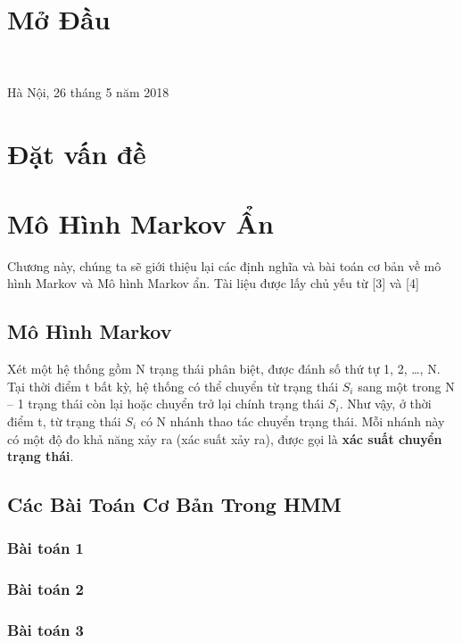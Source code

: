 \documentclass[13pt]{extreport}
\begin{document}
\tableofcontents
\newpage


\newpage
{}
\chapter*{Mở Đầu}\

\begin{flushright}
Hà Nội, 26 tháng 5 năm 2018\\
\end{flushright}

\chapter{Đặt vấn đề}


\newpage
\chapter{Mô Hình Markov Ẩn}
Chương này, chúng ta sẽ giới thiệu lại các định nghĩa và bài toán cơ bản về mô hình Markov và Mô hình Markov ẩn. Tài liệu được lấy chủ yếu từ [3] và [4]
\section{Mô Hình Markov}

Xét một hệ thống gồm N trạng thái phân biệt, được đánh số thứ tự 1, 2, …, N. Tại thời điểm t bất kỳ, hệ thống có thể chuyển từ trạng thái $S_i$ sang một trong N – 1 trạng thái còn lại hoặc chuyển trở lại chính trạng thái $S_i$. 
Như vậy, ở thời điểm t, từ trạng thái $S_i$ có N nhánh thao tác chuyển trạng thái. Mỗi nhánh này có một độ đo khả năng xảy ra (xác suất xảy ra), được gọi là \textbf{xác suất chuyển trạng thái}.\\

\section{Các Bài Toán Cơ Bản Trong HMM}
\subsection{Bài toán 1}

\subsection{Bài toán 2}
\subsection{Bài toán 3}
\end{document}
